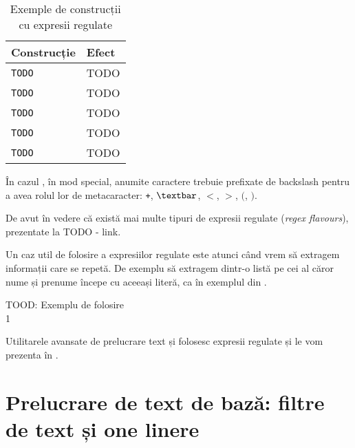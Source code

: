 \begin{table}[!htb]
  \caption{Exemple de construcții cu expresii regulate}
  \begin{center}
    \begin{tabular}{ p{} p{} }
      \toprule
        \textbf{Construcție} &
        \textbf{Efect} \\
      \midrule
        \texttt{TODO} &
        TODO \\

        \texttt{TODO} &
        TODO \\

        \texttt{TODO} &
        TODO \\

        \texttt{TODO} &
        TODO \\

        \texttt{TODO} &
        TODO \\

      \bottomrule
    \end{tabular}
    \label{tab:cli:regex-example}
  \end{center}
\end{table}

În cazul , în mod special, anumite caractere trebuie prefixate de backslash
pentru a avea rolul lor de metacaracter: \texttt{+}, \texttt{$\textbar$}, \texttt{$<$}, \texttt{$>$}, \texttt{$($}, \texttt{$)$}.

De avut în vedere că există mai multe tipuri de expresii regulate (\textit{regex
flavours}), prezentate la TODO - link.

Un caz util de folosire a expresiilor regulate este atunci când vrem să extragem
informații care se repetă. De exemplu să extragem dintr-o listă pe cei al căror
nume și prenume începe cu aceeași literă, ca în exemplul din .

\begin{screen}[caption={Expresii regulate cu variabile},label={lst:cli:regex-var}]
TOOD: Exemplu de folosire \\1
\end{screen}

Utilitarele avansate de prelucrare text  și  folosesc expresii regulate și
le vom prezenta în .

\section{Prelucrare de text de bază: filtre de text și one linere}
\label{sec:cli-basic-proc}

